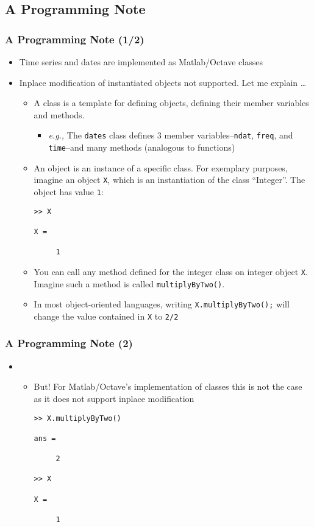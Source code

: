 \documentclass[10pt]{beamer}
\newcommand{\myitem}{\item[$\bullet$]}
\begin{document}
\subsection{A Programming Note}
\begin{frame}[fragile,t]
  \frametitle{A Programming Note (1/2)}
  \begin{itemize}
  \myitem Time series and dates are implemented as Matlab/Octave classes
  \myitem Inplace modification of instantiated objects not supported. Let me explain \dots
    \begin{itemize}
      \myitem A class is a template for defining objects, defining their member
      variables and methods.
      \begin{itemize}
        \myitem \textit{e.g.,} The \texttt{dates} class defines 3 member
        variables--\texttt{ndat}, \texttt{freq}, and \texttt{time}--and many
        methods (analogous to functions)
      \end{itemize}
      \myitem An object is an instance of a specific class. For exemplary
      purposes, imagine an object \texttt{X}, which is an instantiation of the
      class ``Integer''. The object has value \texttt{1}:
\begin{verbatim}
>> X

X =

     1
\end{verbatim}
    \myitem You can call any method defined for the integer class on integer
    object \texttt{X}. Imagine such a method is called
    \texttt{multiplyByTwo()}.
    \myitem In most object-oriented
    languages, writing \texttt{X.multiplyByTwo();} will change the value
    contained in \texttt{X} to \texttt{2/2}
    \end{itemize}
  \end{itemize}
\end{frame}


\begin{frame}[fragile,t]
  \frametitle{A Programming Note (2)}
  \begin{itemize}
    \item[] \begin{itemize}
  \myitem But! For Matlab/Octave's implementation of classes this is not the
    case as it does not support inplace modification
\begin{verbatim}
>> X.multiplyByTwo()

ans =

     2

>> X

X =

     1
\end{verbatim}
  \end{itemize}
  \end{itemize}
\end{frame}
\end{document}
